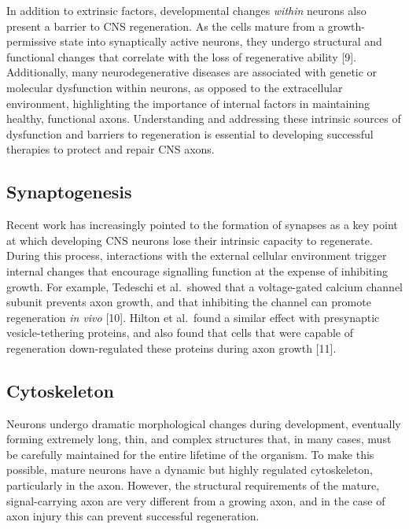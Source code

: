 \documentclass[
  12pt,
  a4paper,
]{book}
\begin{document}
In addition to extrinsic factors, developmental changes \emph{within} neurons also present a barrier to CNS regeneration. As the cells mature from a growth-permissive state into synaptically active neurons, they undergo structural and functional changes that correlate with the loss of regenerative ability {[}9{]}. Additionally, many neurodegenerative diseases are associated with genetic or molecular dysfunction within neurons, as opposed to the extracellular environment, highlighting the importance of internal factors in maintaining healthy, functional axons. Understanding and addressing these intrinsic sources of dysfunction and barriers to regeneration is essential to developing successful therapies to protect and repair CNS axons.

\hypertarget{synaptogenesis}{%
\subsection{Synaptogenesis}\label{synaptogenesis}}

Recent work has increasingly pointed to the formation of synapses as a key point at which developing CNS neurons lose their intrinsic capacity to regenerate. During this process, interactions with the external cellular environment trigger internal changes that encourage signalling function at the expense of inhibiting growth. For example, Tedeschi et al.~showed that a voltage-gated calcium channel subunit prevents axon growth, and that inhibiting the channel can promote regeneration \emph{in vivo} {[}10{]}. Hilton et al.~found a similar effect with presynaptic vesicle-tethering proteins, and also found that cells that were capable of regeneration down-regulated these proteins during axon growth {[}11{]}.

\hypertarget{cytoskeleton}{%
\subsection{Cytoskeleton}\label{cytoskeleton}}

Neurons undergo dramatic morphological changes during development, eventually forming extremely long, thin, and complex structures that, in many cases, must be carefully maintained for the entire lifetime of the organism. To make this possible, mature neurons have a dynamic but highly regulated cytoskeleton, particularly in the axon. However, the structural requirements of the mature, signal-carrying axon are very different from a growing axon, and in the case of axon injury this can prevent successful regeneration.
\end{document}
